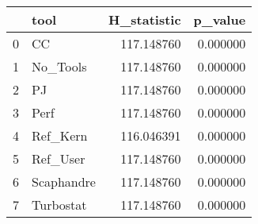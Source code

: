 \begin{tabular}{llrr}
\toprule
 & tool & H_statistic & p_value \\
\midrule
0 & CC & 117.148760 & 0.000000 \\
1 & No_Tools & 117.148760 & 0.000000 \\
2 & PJ & 117.148760 & 0.000000 \\
3 & Perf & 117.148760 & 0.000000 \\
4 & Ref_Kern & 116.046391 & 0.000000 \\
5 & Ref_User & 117.148760 & 0.000000 \\
6 & Scaphandre & 117.148760 & 0.000000 \\
7 & Turbostat & 117.148760 & 0.000000 \\
\bottomrule
\end{tabular}
